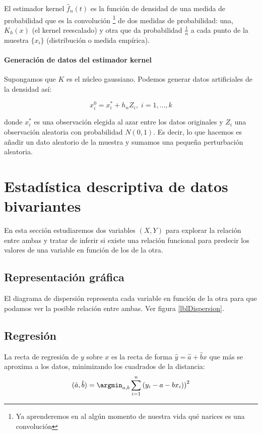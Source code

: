 \documentclass{apuntes}
\begin{document}
El estimador kernel $\hat{f}_n(t)$ es la función de densidad de una medida de probabilidad que es la convolución \footnote{Ya aprenderemos en al algún momento de nuestra vida qué narices es una convolución} de dos medidas de probabilidad: una, $K_h(x)$ (el kernel reescalado) y otra que da probabilidad $\frac{1}{n}$ a cada punto de la muestra $\{x_i\}$ (distribución o medida empírica).

\paragraph{Generación de datos del estimador kernel} Supongamos que $K$ es el núcleo gaussiano. Podemos generar datos artificiales de la densidad así:

\[ x_i^0 = x_i^* + h_n Z_i,\; i=1,\dotsc, k \]

donde $x_i^*$ es una observación elegida al azar entre los datos originales y $Z_i$ una observación aleatoria con probabilidad $N(0,1)$. Es decir, lo que hacemos es añadir un dato aleatorio de la muestra y sumamos una pequeña perturbación aleatoria.

\section{Estadística descriptiva de datos bivariantes}

En esta sección estudiaremos dos variables $(X, Y)$ para explorar la relación entre ambas y tratar de inferir si existe una relación funcional para predecir los valores de una variable en función de los de la otra.

\subsection{Representación gráfica}

\begin{defn}
El diagrama de dispersión representa cada variable en función de la otra para que podamos ver la posible relación entre ambas. Ver figura \ref{lblDispersion}.

\end{defn} 

\subsection{Regresión}

\begin{defn}

La recta de regresión de $y$ sobre $x$ es la recta de forma $\hat{y} = \hat{a} + \hat{b}x$ que más se aproxima a los datos, minimizando los cuadrados de la distancia: \[ (\hat{a},\hat{b}) =\argmin_{a, b} \sum_{i=1}^n\left(y_i - a - bx_i)\right)^2 \]
\end{defn}
\end{document}
